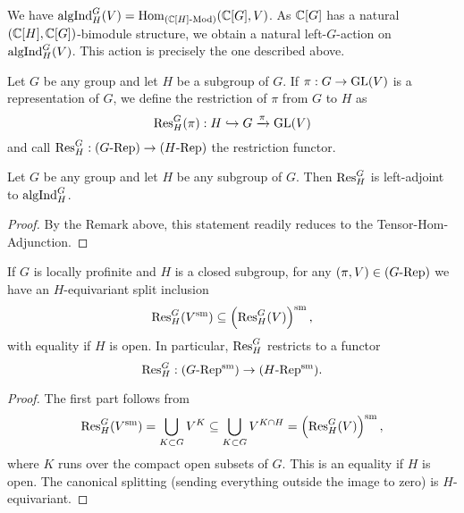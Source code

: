 \documentclass[../main.tex]{subfiles}
\begin{document}
\begin{rmk} 
  We have $\mathrm{algInd}_H^G(V) = \operatorname{Hom}_{{({\mathbb{C}[H]}\text-\allowbreak\mathrm{Mod})}}(\mathbb{C}[G], V)$. As
  $\mathbb{C}[G]$ has a natural $(\mathbb{C}[H], \mathbb{C}[G])$-bimodule structure, we obtain a natural
  left-$G$-action on $\mathrm{algInd}_H^G(V)$. This action is precisely the one
  described above.
\end{rmk}

\begin{defi}\label{def:RestrictionFunctor}
  Let $G$ be any group and let $H$ be a subgroup of $G$.
  If $\pi: G \to \operatorname{GL}(V)$ is a representation of $G$, we define the
  restriction of $\pi$ from $G$ to $H$ as
  \begin{equation*}
    \mathrm{Res}_H^G(\pi): H \hookrightarrow G \xrightarrow{\pi} \operatorname{GL}(V)
  \end{equation*}
  and call $\mathrm{Res}_H^G: {({G}\text-\allowbreak\mathrm{Rep})} \to {({H}\text-\allowbreak\mathrm{Rep})}$ the restriction functor.  
\end{defi}

\begin{lem}\label{lem:AlgFrobRec}
  Let $G$ be any group and let $H$ be any subgroup of $G$. Then 
  $\mathrm{Res}_H^G$ is left-adjoint to $\mathrm{algInd}_H^G$.
\begin{proof}
  By the Remark above, this statement readily reduces to the Tensor-Hom-Adjunction.
\end{proof}
\end{lem}

\begin{lem}\label{lem:SmoothRestriction}
  If $G$ is locally profinite and $H$ is a closed subgroup, for any 
  $(\pi,V) \in {({G}\text-\allowbreak\mathrm{Rep})}$ we have an $H$-equivariant split inclusion
  \begin{equation*}
    \mathrm{Res}_H^G (V^{\mathrm{sm}}) \subseteq \left( \mathrm{Res}_H^G (V) \right)^{\mathrm{sm}},
  \end{equation*}
  with equality if $H$ is open. 
  In particular, $\mathrm{Res}_H^G$ restricts to a functor
  \begin{equation*}
    \mathrm{Res}_H^G: {({G}\text-\allowbreak\mathrm{Rep^{\mathrm{sm}}})} \to {({H}\text-\allowbreak\mathrm{Rep^{\mathrm{sm}}})}.
  \end{equation*}
\begin{proof}
  The first part follows from
  \begin{equation*}
    \mathrm{Res}_H^G(V^{\mathrm{sm}}) = \bigcup_{K \subset G} V^K \subseteq \bigcup_{K \subset G}
    V^{K \cap H} = \left(\mathrm{Res}_H^G(V)\right)^{\mathrm{sm}},
  \end{equation*}
  where $K$ runs over the compact open subsets of $G$. This is an equality if
  $H$ is open. The canonical splitting (sending everything outside the image to 
  zero) is $H$-equivariant.
\end{proof}
\end{lem}
\end{document}
